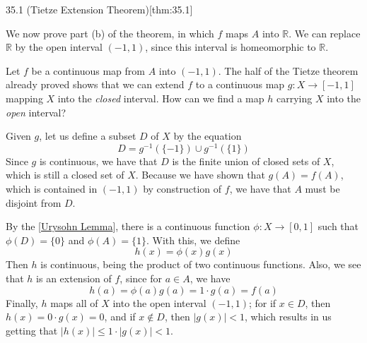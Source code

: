 \begin{thmBox}{35.1 (Tietze Extension Theorem)}[thm:35.1]
\begin{proofBox}
    \baseSkip 

    We now prove part (b) of the theorem, in which \( f \) maps \( A \) into 
    \( \mathbb{R} \). 
    We can replace \( \mathbb{R} \) by the open interval \( ( -1, 1 ) \), since 
    this interval is homeomorphic to \( \mathbb{R} \). 

    \baseSkip 

    Let \( f \) be a continuous map from \( A \) into \( ( -1, 1 ) \). 
    The half of the Tietze theorem already proved shows that we can extend 
    \( f \) to a continuous map \( g: X \rightarrow [ -1, 1 ] \) mapping 
    \( X \) into the \textit{closed} interval. 
    How can we find a map \( h \) carrying \( X \) into the \textit{open} 
    interval?

    \baseSkip 

    Given \( g \), let us define a subset \( D \) of \( X \) by the equation 
    \begin{equation*}
        D
        =
        g^{ -1 } ( \{ -1 \} ) \cup g^{ -1 } ( \{ 1 \} )
    \end{equation*}
    Since \( g \) is continuous, we have that \( D \) is the finite union of 
    closed sets of \( X \), which is still a closed set of \( X \). 
    Because we have shown that \( g ( A ) = f ( A ) \), which is contained in 
    \( ( -1, 1 ) \) by construction of \( f \), we have that \( A \) must be 
    disjoint from \( D \). 
    
    \baseSkip 

    By the [\hyperlink{thm33.1}{Urysohn Lemma}], there is a continuous function 
    \( \phi: X \rightarrow [ 0, 1 ] \) such that \( \phi ( D ) = \{ 0 \} \) and 
    \( \phi ( A ) = \{ 1 \} \). 
    With this, we define 
    \begin{equation*}
        h ( x ) = \phi ( x ) g ( x )
    \end{equation*}
    Then \( h \) is continuous, being the product of two continuous functions. 
    Also, we see that \( h \) is an extension of \( f \), since for \( a \in A \),
    we have 
    \begin{equation*}
        h ( a )
        =
        \phi ( a ) g ( a ) = 1 \cdot g ( a ) = f ( a )
    \end{equation*}
    Finally, \( h \) maps all of \( X \) into the open interval \( ( -1, 1 ) \);
    for if \( x \in D \), then \( h ( x ) = 0 \cdot g ( x ) = 0 \), and if 
    \( x \notin D \), then \( \lvert g ( x ) \rvert < 1 \), which results in us 
    getting that \( \lvert h ( x ) \rvert \leq 1 \cdot \lvert g ( x ) \rvert < 1 \).
\end{proofBox}
\end{thmBox}